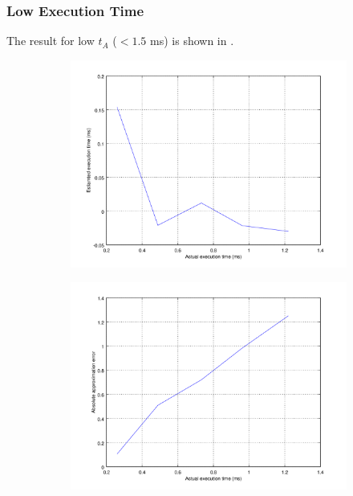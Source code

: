 \subsubsection{Low Execution Time}

The result for  low $t_A$ ($<1.5$ ms) is shown in .

\begin{figure}[ht!]
	\center
	\begin{subfigure}{0.8\linewidth}
	\center
	\includegraphics[width=\linewidth]{fig/lowtaest.png}
	\end{subfigure}
	\begin{subfigure}{0.45\linewidth}
	\center
	\includegraphics[width=\linewidth]{fig/lowabstaerr.png}

\end{subfigure}
\end{figure}
